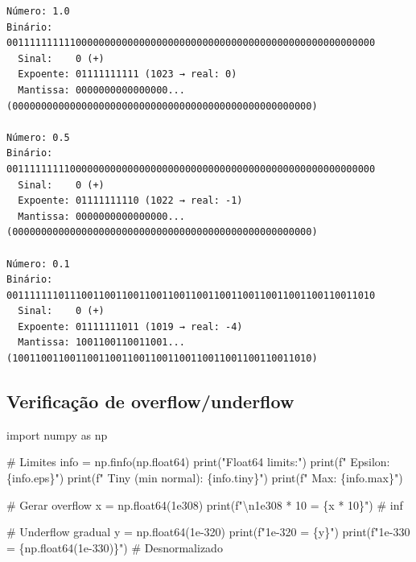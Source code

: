 \documentclass[
  11pt,
  letterpaper,
  DIV=11,
  numbers=noendperiod]{scrartcl}
\newenvironment{Shaded}{\begin{snugshade}}{\end{snugshade}}
\newcommand{\BuiltInTok}[1]{\textcolor[rgb]{0.00,0.23,0.31}{#1}}
\newcommand{\CharTok}[1]{\textcolor[rgb]{0.13,0.47,0.30}{#1}}
\newcommand{\CommentTok}[1]{\textcolor[rgb]{0.37,0.37,0.37}{#1}}
\newcommand{\DecValTok}[1]{\textcolor[rgb]{0.68,0.00,0.00}{#1}}
\newcommand{\FloatTok}[1]{\textcolor[rgb]{0.68,0.00,0.00}{#1}}
\newcommand{\ImportTok}[1]{\textcolor[rgb]{0.00,0.46,0.62}{#1}}
\newcommand{\NormalTok}[1]{\textcolor[rgb]{0.00,0.23,0.31}{#1}}
\newcommand{\OperatorTok}[1]{\textcolor[rgb]{0.37,0.37,0.37}{#1}}
\newcommand{\SpecialCharTok}[1]{\textcolor[rgb]{0.37,0.37,0.37}{#1}}
\newcommand{\SpecialStringTok}[1]{\textcolor[rgb]{0.13,0.47,0.30}{#1}}
\newcommand{\StringTok}[1]{\textcolor[rgb]{0.13,0.47,0.30}{#1}}
\begin{document}
\begin{verbatim}
Número: 1.0
Binário: 0011111111110000000000000000000000000000000000000000000000000000
  Sinal:    0 (+)
  Expoente: 01111111111 (1023 → real: 0)
  Mantissa: 0000000000000000... (0000000000000000000000000000000000000000000000000000)

Número: 0.5
Binário: 0011111111100000000000000000000000000000000000000000000000000000
  Sinal:    0 (+)
  Expoente: 01111111110 (1022 → real: -1)
  Mantissa: 0000000000000000... (0000000000000000000000000000000000000000000000000000)

Número: 0.1
Binário: 0011111110111001100110011001100110011001100110011001100110011010
  Sinal:    0 (+)
  Expoente: 01111111011 (1019 → real: -4)
  Mantissa: 1001100110011001... (1001100110011001100110011001100110011001100110011010)
\end{verbatim}

\subsection{Verificação de
overflow/underflow}\label{verificauxe7uxe3o-de-overflowunderflow}

\begin{Shaded}
\begin{Highlighting}[]
\ImportTok{import}\NormalTok{ numpy }\ImportTok{as}\NormalTok{ np}

\CommentTok{\# Limites}
\NormalTok{info }\OperatorTok{=}\NormalTok{ np.finfo(np.float64)}
\BuiltInTok{print}\NormalTok{(}\StringTok{"Float64 limits:"}\NormalTok{)}
\BuiltInTok{print}\NormalTok{(}\SpecialStringTok{f"  Epsilon:            }\SpecialCharTok{\{}\NormalTok{info}\SpecialCharTok{.}\NormalTok{eps}\SpecialCharTok{\}}\SpecialStringTok{"}\NormalTok{)}
\BuiltInTok{print}\NormalTok{(}\SpecialStringTok{f"  Tiny (min normal):  }\SpecialCharTok{\{}\NormalTok{info}\SpecialCharTok{.}\NormalTok{tiny}\SpecialCharTok{\}}\SpecialStringTok{"}\NormalTok{)}
\BuiltInTok{print}\NormalTok{(}\SpecialStringTok{f"  Max:                }\SpecialCharTok{\{}\NormalTok{info}\SpecialCharTok{.}\BuiltInTok{max}\SpecialCharTok{\}}\SpecialStringTok{"}\NormalTok{)}

\CommentTok{\# Gerar overflow}
\NormalTok{x }\OperatorTok{=}\NormalTok{ np.float64(}\FloatTok{1e308}\NormalTok{)}
\BuiltInTok{print}\NormalTok{(}\SpecialStringTok{f"}\CharTok{\textbackslash{}n}\SpecialStringTok{1e308 * 10 = }\SpecialCharTok{\{}\NormalTok{x }\OperatorTok{*} \DecValTok{10}\SpecialCharTok{\}}\SpecialStringTok{"}\NormalTok{)  }\CommentTok{\# inf}

\CommentTok{\# Underflow gradual}
\NormalTok{y }\OperatorTok{=}\NormalTok{ np.float64(}\FloatTok{1e{-}320}\NormalTok{)}
\BuiltInTok{print}\NormalTok{(}\SpecialStringTok{f"1e{-}320 = }\SpecialCharTok{\{}\NormalTok{y}\SpecialCharTok{\}}\SpecialStringTok{"}\NormalTok{)}
\BuiltInTok{print}\NormalTok{(}\SpecialStringTok{f"1e{-}330 = }\SpecialCharTok{\{}\NormalTok{np}\SpecialCharTok{.}\NormalTok{float64(}\FloatTok{1e{-}330}\NormalTok{)}\SpecialCharTok{\}}\SpecialStringTok{"}\NormalTok{)  }\CommentTok{\# Desnormalizado}
\end{Highlighting}
\end{Shaded}
\end{document}
